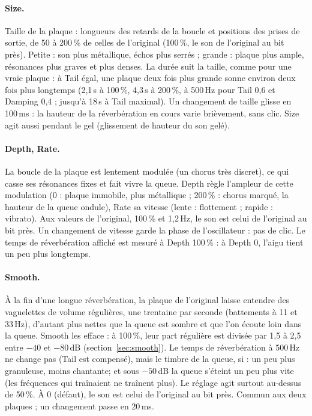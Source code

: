 \documentclass[a4paper,11pt]{article}
\newcommand{\dB}{\,dB}
\begin{document}
\paragraph{Size.} Taille de la plaque : longueurs des retards de la boucle et positions des
prises de sortie, de 50 à 200\,\% de celles de l'original (100\,\%, le son de l'original au bit
près). Petite : son plus métallique, échos plus serrés ; grande : plaque plus ample, résonances
plus graves et plus denses. La durée suit la taille, comme pour une vraie plaque : à Tail égal,
une plaque deux fois plus grande sonne environ deux fois plus longtemps (2,1\,s à 100\,\%,
4,3\,s à 200\,\%, à 500\,Hz pour Tail 0,6 et Damping 0,4 ; jusqu'à 18\,s à Tail maximal).
Un changement de taille glisse en 100\,ms : la hauteur de la réverbération en cours varie
brièvement, sans clic. Size agit aussi pendant le gel (glissement de hauteur du son gelé).

\paragraph{Depth, Rate.} La boucle de la plaque est lentement modulée (un chorus très
discret), ce qui casse ses résonances fixes et fait vivre la queue. Depth règle l'ampleur de
cette modulation (0 : plaque immobile, plus métallique ; 200\,\% : chorus marqué, la hauteur
de la queue ondule), Rate sa vitesse (lente : flottement ; rapide : vibrato). Aux valeurs de
l'original, 100\,\% et 1,2\,Hz, le son est celui de l'original au bit près. Un changement
de vitesse garde la phase de l'oscillateur : pas de clic. Le temps de réverbération affiché est
mesuré à Depth 100\,\% : à Depth 0, l'aigu tient un peu plus longtemps.

\paragraph{Smooth.} À la fin d'une longue réverbération, la plaque de l'original laisse entendre
des vaguelettes de volume régulières, une trentaine par seconde (battements à 11 et 33\,Hz),
d'autant plus nettes que la queue est sombre et que l'on écoute loin dans la queue. Smooth les
efface : à 100\,\%, leur part régulière est divisée par 1,5 à 2,5 entre $-40$ et $-80$\dB{}
(section~\ref{sec:smooth}). Le temps de réverbération à 500\,Hz ne change pas (Tail est
compensé), mais le timbre de la queue, si : un peu plus granuleuse, moins \og chantante\fg ; et
sous $-50$\dB{} la queue s'éteint un peu plus vite (les fréquences qui traînaient ne traînent
plus). Le
réglage agit surtout au-dessus de 50\,\%. À 0 (défaut), le son est celui de l'original au bit
près. Commun aux deux plaques ; un changement passe en 20\,ms.
\end{document}

